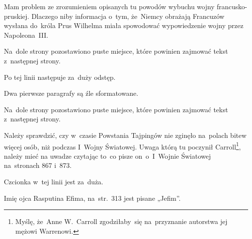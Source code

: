 \documentclass[a4paper,11pt]{article}
\begin{document}
\VerSpaceFour





\noindent
{} Mam problem ze zrozumieniem opisanych tu powodów wybuchu wojny
francusko-pruskiej. Dlaczego niby informacja o~tym, że~Niemcy obrażają
Francuzów wysłana do~króla Prus Wilhelma miała spowodować wypowiedzenie
wojny przez Napoleona~III.

\VerSpaceFour





\noindent
{} Na~dole strony pozostawiono puste miejsce, które powinien
zajmować tekst z~następnej strony.

\VerSpaceFour





\noindent
{} Po tej linii następuje za~duży odstęp.

\VerSpaceFour





\noindent
{} Dwa pierwsze paragrafy są źle sformatowane.

\VerSpaceFour





\noindent
{} Na~dole strony pozostawiono puste miejsce, które powinien
zajmować tekst z~następnej strony.

\VerSpaceFour





\noindent
{} Należy sprawdzić, czy w~czasie Powstania Tajpingów nie zginęło
na~polach bitew więcej osób, niż podczas I~Wojny Światowej. Uwaga którą tu
poczynił Carroll\footnote{Myślę, że~Anne W.~Carroll zgodziłaby~się
  na~przyznanie autorstwa jej mężowi Warrenowi.}, należy mieć na uwadze
czytając to~co pisze on~o~I~Wojnie Światowej na~stronach 867 i~873.

\VerSpaceFour





\noindent
{} Czcionka w~tej linii jest za~duża.

\VerSpaceFour





\noindent
{} Imię ojca Rasputina Efima, na~str.~313 jest pisane
„Jefim”.

\VerSpaceFour
\end{document}
